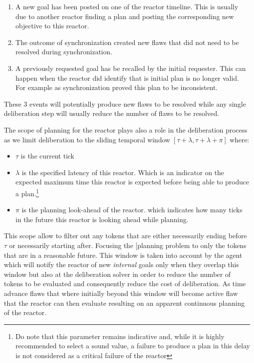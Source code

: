\begin{enumerate}

\item A new goal has been posted on one of the reactor timeline. This
  is usually due to another reactor finding a plan and posting the
  corresponding new objective to this reactor.

\item The outcome of synchronization created new flaws that did not
  need to be resolved during synchronization.

\item A previously requested goal has be recalled by the initial
  requester. This can happen when the reactor did identify that is
  initial plan is no longer valid. For example as synchronization
  proved this plan to be inconsistent.

\end{enumerate}

These 3 events will potentially produce new flaws to be resolved while
any single deliberation step will usually reduce the number of flaws
to be resolved.

The scope of planning for the reactor plays also a role in the
deliberation process as we limit deliberation to the sliding temporal
window $[\tau+\lambda, \tau+\lambda+\pi]$ where:

\begin{itemize}

\item $\tau$ is the current tick

\item $\lambda$ is the specified latency of this reactor. Which is an
  indicator on the expected maximum time this reactor is expected
  before being able to produce a plan.\footnote{Do note that this
    parameter remains indicative and, while it is highly recommended
    to select a sound value, a failure to produce a plan in this delay
    is not considered as a critical failure of the reactor}

\item $\pi$ is the planning look-ahead of the reactor. which indicates
  how many ticks in the future this reactor is looking ahead while planning.

\end{itemize}

This scope allow to filter out any tokens that are either necessarily
ending before $\tau$ or necessarily starting after. Focusing the
[planning problem to only the tokens that are in a reasonable
future. This window is taken into account by the agent which will
notify the reactor of new {\em internal} goals only when they overlap
this window but also at the deliberation solver in order to reduce the
number of tokens to be evaluated and consequently reduce the cost of
deliberation. As time advance flaws that where initially beyond this
window will become active flaw that the reactor can then evaluate
resulting on an apparent continuous planning of the reactor.

